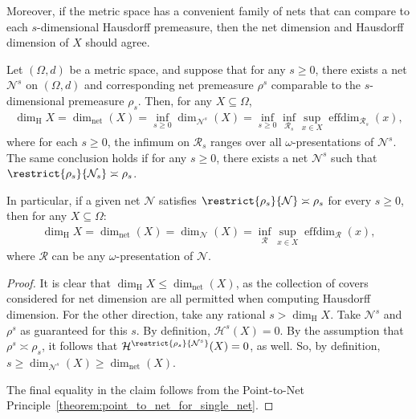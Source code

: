 Moreover, if the metric space has a convenient family of nets that can compare to each $s$-dimensional Hausdorff premeasure, then the net dimension and Hausdorff dimension of $X$ should agree.

\begin{theorem}
    \label{theorem:PTS_for_inf_over_nets}
    Let $(\Omega, d)$ be a metric space, and suppose that for any $s \geq 0$, there exists a net $\mathcal{N}^s$ on $(\Omega, d)$ and corresponding net premeasure $\rho^s$ comparable to the $s$-dimensional premeasure $\rho_s$. Then, for any $X \subseteq \Omega$,
    \begin{align*}
        \dim_{\operatorname{H}} X = \dim_{\operatorname{net}}(X) = \inf_{s \geq 0} \dim_{\mathcal{N}^s}(X) = \inf_{s \geq 0} \inf_{\mathscr{R}_s} \sup_{x \in X} \operatorname{effdim}_{\mathscr{R}_s}(x),
    \end{align*}
    where for each $s \geq 0$, the infimum on $\mathscr{R}_s$ ranges over all $\omega$-presentations of $\mathcal{N}^s$. The same conclusion holds if for any $s \geq 0$, there exists a net $\mathcal{N}^s$ such that $\restrict{\rho_s}{\mathcal{N}_s} \asymp \rho_s$. 
    
    In particular, if a given net $\mathcal{N}$ satisfies $\restrict{\rho_s}{\mathcal{N}} \asymp \rho_s$ for every $s \geq 0$, then for any $X \subseteq \Omega$:
    \begin{align*}
        \dim_{\operatorname{H}} X = \dim_{\operatorname{net}}(X) = \dim_{\mathcal{N}}(X) = \inf_{\mathscr{R}} \sup_{x \in X} \operatorname{effdim}_{\mathscr{R}}(x),
    \end{align*}
    where $\mathscr{R}$ can be any $\omega$-presentation of $\mathcal{N}$.
\end{theorem}
\begin{proof}
    It is clear that $\dim_{\operatorname{H}} X \leq \dim_{\operatorname{net}}(X)$, as the collection of covers considered for net dimension are all permitted when computing Hausdorff dimension. For the other direction, take any rational $s > \dim_{\operatorname{H}} X$. Take $\mathcal{N}^s$ and $\rho^s$ as guaranteed for this $s$. By definition, $\mathcal{H}^s(X) = 0$. By the assumption that $\rho^s \asymp \rho_s$, it follows that $\mathcal{H}^{\restrict{\rho_s}{\mathcal{N}^s}}(X) = 0$, as well. So, by definition, $s \geq \dim_{\mathcal{N}^s}(X) \geq \dim_{\operatorname{net}}(X)$.

    The final equality in the claim follows from the Point-to-Net Principle~\ref{theorem:point_to_net_for_single_net}.
\end{proof}

